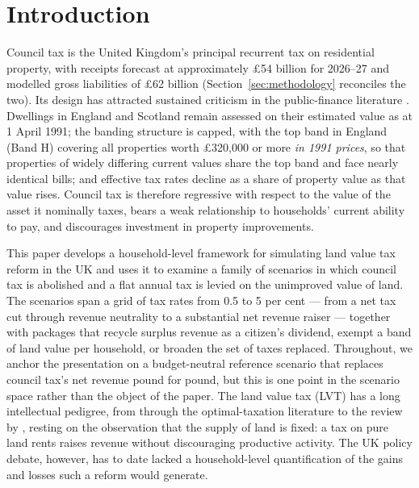 \section{Introduction}
\label{sec:intro}

Council tax is the United Kingdom's principal recurrent tax on residential property, with receipts forecast at approximately \pounds 54 billion for 2026--27 \citep{obr2025} and modelled gross liabilities of \pounds 62 billion (Section~\ref{sec:methodology} reconciles the two). Its design has attracted sustained criticism in the public-finance literature \citep{mirrlees2011, adam2020}. Dwellings in England and Scotland remain assessed on their estimated value as at 1 April 1991; the banding structure is capped, with the top band in England (Band H) covering all properties worth \pounds 320{,}000 or more \emph{in 1991 prices}, so that properties of widely differing current values share the top band and face nearly identical bills; and effective tax rates decline as a share of property value as that value rises. Council tax is therefore regressive with respect to the value of the asset it nominally taxes, bears a weak relationship to households' current ability to pay, and discourages investment in property improvements.

This paper develops a household-level framework for simulating land value tax reform in the UK and uses it to examine a family of scenarios in which council tax is abolished and a flat annual tax is levied on the unimproved value of land. The scenarios span a grid of tax rates from 0.5 to 5 per cent --- from a net tax cut through revenue neutrality to a substantial net revenue raiser --- together with packages that recycle surplus revenue as a citizen's dividend, exempt a band of land value per household, or broaden the set of taxes replaced. Throughout, we anchor the presentation on a budget-neutral reference scenario that replaces council tax's net revenue pound for pound, but this is one point in the scenario space rather than the object of the paper. The land value tax (LVT) has a long intellectual pedigree, from \citet{george1879} through the optimal-taxation literature \citep{ramsey1927} to the review by \citet{mirrlees2011}, resting on the observation that the supply of land is fixed: a tax on pure land rents raises revenue without discouraging productive activity. The UK policy debate, however, has to date lacked a household-level quantification of the gains and losses such a reform would generate.

